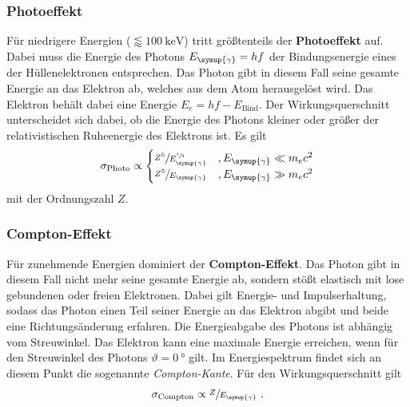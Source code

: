     \subsubsection*{Photoeffekt} \label{sec:theorie:photoeffekt}
    Für niedrigere Energien ($\lessapprox \SI{100}{\kilo\electronvolt}$) tritt größtenteils der \textbf{Photoeffekt} auf.
    Dabei muss die Energie des Photons $E_{\symup{\gamma}} = hf$ der Bindungsenergie eines der Hüllenelektronen entsprechen.
    Das Photon gibt in diesem Fall seine gesamte Energie an das Elektron ab,
    welches aus dem Atom herausgelöst wird.
    Das Elektron behält dabei eine Energie $E_{e} = hf - E_\text{Bind}$.
    Der Wirkungsquerschnitt unterscheidet sich dabei,
    ob die Energie des Photons kleiner oder größer der relativistischen Ruheenergie des Elektrons ist.
    Es gilt
    \begin{equation*}
        \sigma_\text{Photo} \propto
        \begin{cases}
            \sfrac{Z^5}{E^{\sfrac{7}{2}}_{\symup{\gamma}}} & , E_{\symup{\gamma}} \ll m_{e} c^2 \\
            \sfrac{Z^5}{E_{\symup{\gamma}}} & , E_{\symup{\gamma}} \gg m_{e} c^2 \\
        \end{cases}
    \end{equation*}
    mit der Ordnungszahl $Z$.

    \subsubsection*{Compton-Effekt} \label{sec:theorie:comptoneffekt}
    Für zunehmende Energien dominiert der \textbf{Compton-Effekt}.
    Das Photon gibt in diesem Fall nicht mehr seine gesamte Energie ab,
    sondern stößt elastisch mit lose gebundenen oder freien Elektronen.
    Dabei gilt Energie- und Impulserhaltung,
    sodass das Photon einen Teil seiner Energie an das Elektron abgibt und beide eine Richtungsänderung erfahren.
    Die Energieabgabe des Photons ist abhängig vom Streuwinkel.
    Das Elektron kann eine maximale Energie erreichen,
    wenn für den Streuwinkel des Photons $\vartheta = \SI{0}{\degree}$ gilt.
    Im Energiespektrum findet sich an diesem Punkt die sogenannte \textit{Compton-Kante}.
    Für den Wirkungsquerschnitt gilt
    \begin{equation*}
        \sigma_\text{Compton} \propto \sfrac{Z}{E_{\symup{\gamma}}} \ .
    \end{equation*}


